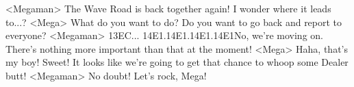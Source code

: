 <Megaman> The Wave Road is back together again! 
I wonder where it leads to...? 
<Mega> What do you want to do? Do you want to go back and report to everyone? 
<Megaman> {13}{EC}... 
{14}{E1}.{14}{E1}.{14}{E1}.{14}{E1}No, we're moving on. 
There's nothing more important than that at the moment! 
<Mega> Haha, that's my boy! 
Sweet! It looks like we're going to get that chance to whoop some Dealer butt! 
<Megaman> No doubt! Let's rock, Mega! 
